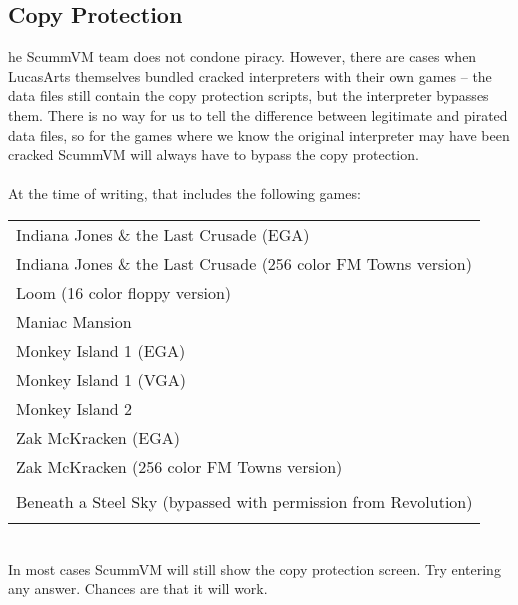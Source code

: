 \subsection{Copy Protection}

he ScummVM team does not condone piracy. However, there are cases when
LucasArts themselves bundled cracked interpreters with their own games --
the data files still contain the copy protection scripts, but the interpreter
bypasses them. There is no way for us to tell the difference between legitimate
and pirated data files, so for the games where we know the original interpreter
may have been cracked ScummVM will always have to bypass the copy protection.\\
\quad \\
At the time of writing, that includes the following games:\\
\begin{tabular}{l}
Indiana Jones \& the Last Crusade (EGA)\\
Indiana Jones \& the Last Crusade (256 color FM Towns version)\\
Loom (16 color floppy version)\\
Maniac Mansion\\
Monkey Island 1 (EGA)\\
Monkey Island 1 (VGA)\\
Monkey Island 2\\
Zak McKracken (EGA)\\
Zak McKracken (256 color FM Towns version)\\
\\
Beneath a Steel Sky (bypassed with permission from Revolution)\\
\\
\end{tabular}\\
In most cases ScummVM will still show the copy protection screen. Try entering
any answer. Chances are that it will work.